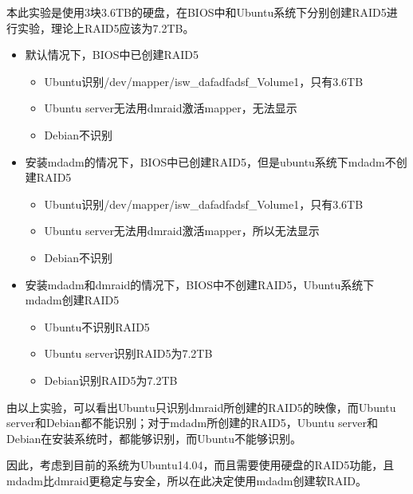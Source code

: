 本此实验是使用3块3.6TB的硬盘，在BIOS中和Ubuntu系统下分别创建RAID5进行实验，理论上RAID5应该为7.2TB。
\begin{itemize}
\item 默认情况下，BIOS中已创建RAID5
	\begin{itemize}
	\item Ubuntu识别/dev/mapper/isw\_dafadfadsf\_Volume1，只有3.6TB 
	\item Ubuntu server无法用dmraid激活mapper，无法显示
	\item Debian不识别
	\end{itemize}
\item 安装mdadm的情况下，BIOS中已创建RAID5，但是ubuntu系统下mdadm不创建RAID5
	\begin{itemize}
	\item Ubuntu识别/dev/mapper/isw\_dafadfadsf\_Volume1，只有3.6TB 
	\item Ubuntu server无法用dmraid激活mapper，所以无法显示
	\item Debian不识别
	\end{itemize}
\item 安装mdadm和dmraid的情况下，BIOS中不创建RAID5，Ubuntu系统下mdadm创建RAID5
	\begin{itemize}
	\item Ubuntu不识别RAID5
	\item Ubuntu server识别RAID5为7.2TB
	\item Debian识别RAID5为7.2TB
	\end{itemize}
\end{itemize}
由以上实验，可以看出Ubuntu只识别dmraid所创建的RAID5的映像，而Ubuntu server和Debian都不能识别；对于mdadm所创建的RAID5，Ubuntu server和Debian在安装系统时，都能够识别，而Ubuntu不能够识别。

因此，考虑到目前的系统为Ubuntu14.04，而且需要使用硬盘的RAID5功能，且mdadm比dmraid更稳定与安全，所以在此决定使用mdadm创建软RAID。

